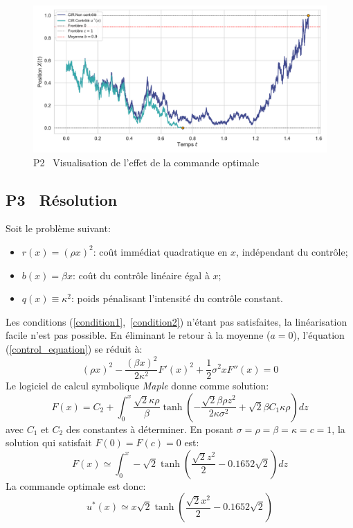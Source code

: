 \begin{figure}[htb]
    \centering
    \includegraphics[width=0.9\linewidth]{img/validation/P2/p2_control_simulation.pdf}
    \caption{P2 \textemdash~Visualisation de l'effet de la commande optimale}\label{fig:Simulation2}
\end{figure}\FloatBarrier\subsection{P3 \textemdash~Résolution}\label{p3}
Soit le problème suivant:
\begin{itemize}
    \item $r(x) = {(\rho x)}^2$: coût immédiat quadratique en $x$, indépendant du contrôle;
    \item $b(x) = \beta x$: coût du contrôle linéaire égal à $x$;
    \item $q(x) \equiv \kappa^2$: poids pénalisant l'intensité du contrôle constant.
\end{itemize}
Les conditions (\ref{condition1},~\ref{condition2}) n'étant pas satisfaites, la linéarisation facile n'est pas possible. En éliminant le retour à la moyenne ($a=0$), l'équation (\ref{control_equation}) se réduit à:
\[
    {(\rho x)}^2-\frac{{(\beta x)}^2}{2\kappa^2}{F'(x)}^2+\frac{1}{2}\sigma^2xF''(x)=0
\]
Le logiciel de calcul symbolique \textit{Maple} donne comme solution:
\[
    F(x)=C_2+\int_0^x\frac{\sqrt{2} \kappa  \rho  }{\beta }\tanh \left(-\frac{\sqrt{2} \beta  \rho  z^2}{2\kappa  \sigma ^2}+\sqrt{2} \beta  C_1 \kappa  \rho\right)dz
\]
avec $C_1$ et $C_2$ des constantes à déterminer. En posant $\sigma=\rho=\beta=\kappa=c=1$, la solution qui satisfait \(F(0)=F(c)=0\) est:
\begin{equation}\label{sol_control_3}
    F(x)\simeq \int_0^x-\sqrt{2}\tanh\left(\frac{\sqrt{2}z^2}{2}-0.1652\sqrt{2}\right)dz
\end{equation}
La commande optimale est donc:
\begin{equation}\label{optimal_control_3}
    u^*(x)\simeq x\sqrt{2}\tanh\left(\frac{\sqrt{2}x^2}{2}-0.1652\sqrt{2}\right)
\end{equation}
